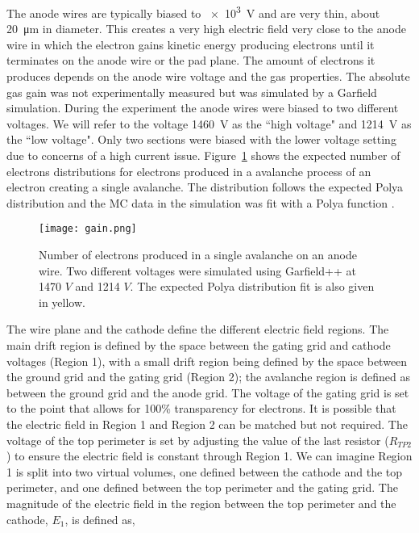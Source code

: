 The anode wires are typically biased to \SI{e3}{\volt} and are very thin, about \SI{20}{\micro\metre} in diameter. This creates a very high electric field very close to the anode wire in which the electron gains kinetic energy producing electrons until it terminates on the anode wire or the pad plane. The amount of electrons it produces depends on the anode wire voltage and the gas properties. The absolute gas gain was not experimentally measured but was simulated by a Garfield simulation. During the experiment the anode wires were biased to two different voltages. We will refer to the voltage \SI{1460}{\volt} as the ``high voltage" and \SI{1214}{\volt} as the ``low voltage". Only two sections were biased with the lower voltage setting due to concerns of a high current issue. Figure~\ref{fig:anodegain} shows the expected number of electrons distributions for electrons produced in a avalanche process of an electron creating a single avalanche. The distribution follows the expected Polya distribution and the MC data in the simulation was fit with a Polya function \cite{blumrol}. 



\begin{figure}[!htb]
\texttt{[image: gain.png]}
\caption{Number of electrons produced in a single avalanche on an anode wire. Two different voltages were simulated using Garfield++ at 1470 $V$ and 1214 $V$. The expected Polya distribution fit is also given in yellow.}
\label{fig:anodegain}
\end{figure}


The wire plane and the cathode define the different electric field regions. The main drift region is defined by the space between the gating grid and cathode voltages (Region 1), with a small drift region being defined by the space between the ground grid and the gating grid (Region 2); the avalanche region is defined as between the ground grid and the anode grid. The voltage of the gating grid is set to the point that allows for 100\% transparency for electrons. It is possible that the electric field in Region 1 and Region 2 can be matched but not required. The voltage of the top perimeter is set by adjusting the value of the last resistor ($R_{TP2}$) to ensure the electric field is constant through Region 1. We can imagine Region 1 is split into two virtual volumes, one defined between the cathode and the top perimeter, and one defined between the top perimeter and the gating grid. The magnitude of the electric field in the region between the top perimeter and the cathode, $E_1$, is defined as,

